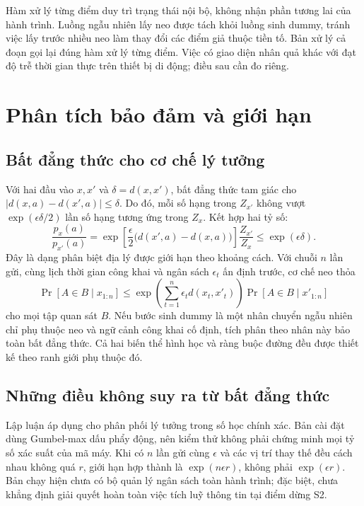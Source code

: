 Hàm xử lý từng điểm duy trì trạng thái nội bộ, không nhận phần tương lai của hành trình. Luồng ngẫu nhiên lấy neo được tách khỏi luồng sinh dummy, tránh việc lấy trước nhiều neo làm thay đổi các điểm giả thuộc tiền tố. Bản xử lý cả đoạn gọi lại đúng hàm xử lý từng điểm. Việc có giao diện nhân quả khác với đạt độ trễ thời gian thực trên thiết bị di động; điều sau cần đo riêng.

\section{Phân tích bảo đảm và giới hạn}

\subsection{Bất đẳng thức cho cơ chế lý tưởng}

Với hai đầu vào $x,x'$ và $\delta=d(x,x')$, bất đẳng thức tam giác cho
$|d(x,a)-d(x',a)|\leq\delta$. Do đó, mỗi số hạng trong $Z_{x'}$ không vượt $\exp(\epsilon\delta/2)$ lần số hạng tương ứng trong $Z_x$. Kết hợp hai tỷ số:
\[
 \frac{p_x(a)}{p_{x'}(a)}
 =\exp\!\left[\frac{\epsilon}{2}\big(d(x',a)-d(x,a)\big)\right]
   \frac{Z_{x'}}{Z_x}
 \leq \exp(\epsilon\delta).
\]
Đây là dạng phân biệt địa lý được giới hạn theo khoảng cách. Với chuỗi $n$ lần gửi, cùng lịch thời gian công khai và ngân sách $\epsilon_t$ ấn định trước, cơ chế neo thỏa
\[
 \Pr[A\in B\mid x_{1:n}]
 \leq \exp\!\left(\sum_{t=1}^{n}\epsilon_t d(x_t,x'_t)\right)
       \Pr[A\in B\mid x'_{1:n}]
\]
cho mọi tập quan sát $B$. Nếu bước sinh dummy là một nhân chuyển ngẫu nhiên chỉ phụ thuộc neo và ngữ cảnh công khai cố định, tích phân theo nhân này bảo toàn bất đẳng thức. Cả hai biến thể hình học và ràng buộc đường đều được thiết kế theo ranh giới phụ thuộc đó.

\subsection{Những điều không suy ra từ bất đẳng thức}

Lập luận áp dụng cho phân phối lý tưởng trong số học chính xác. Bản cài đặt dùng Gumbel-max dấu phẩy động, nên kiểm thử không phải chứng minh mọi tỷ số xác suất của mã máy. Khi có $n$ lần gửi cùng $\epsilon$ và các vị trí thay thế đều cách nhau không quá $r$, giới hạn hợp thành là $\exp(n\epsilon r)$, không phải $\exp(\epsilon r)$. Bản chạy hiện chưa có bộ quản lý ngân sách toàn hành trình; đặc biệt, chưa khẳng định giải quyết hoàn toàn việc tích luỹ thông tin tại điểm dừng S2.


